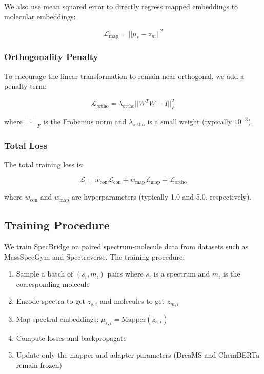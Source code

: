 \documentclass[11pt]{article}
\begin{document}
We also use mean squared error to directly regress mapped embeddings to molecular embeddings:

\begin{equation}
\mathcal{L}_{\text{map}} = ||\mu_s - z_m||^2
\end{equation}

\subsubsection{Orthogonality Penalty}

To encourage the linear transformation to remain near-orthogonal, we add a penalty term:

\begin{equation}
\mathcal{L}_{\text{ortho}} = \lambda_{\text{ortho}} ||W^T W - I||_F^2
\end{equation}

where $||\cdot||_F$ is the Frobenius norm and $\lambda_{\text{ortho}}$ is a small weight (typically $10^{-3}$).

\subsubsection{Total Loss}

The total training loss is:

\begin{equation}
\mathcal{L} = w_{\text{con}} \mathcal{L}_{\text{con}} + w_{\text{map}} \mathcal{L}_{\text{map}} + \mathcal{L}_{\text{ortho}}
\end{equation}

where $w_{\text{con}}$ and $w_{\text{map}}$ are hyperparameters (typically 1.0 and 5.0, respectively).

\subsection{Training Procedure}

We train SpecBridge on paired spectrum-molecule data from datasets such as MassSpecGym and Spectraverse. The training procedure:

\begin{enumerate}
    \item Sample a batch of $(s_i, m_i)$ pairs where $s_i$ is a spectrum and $m_i$ is the corresponding molecule
    \item Encode spectra to get $z_{s,i}$ and molecules to get $z_{m,i}$
    \item Map spectral embeddings: $\mu_{s,i} = \text{Mapper}(z_{s,i})$
    \item Compute losses and backpropagate
    \item Update only the mapper and adapter parameters (DreaMS and ChemBERTa remain frozen)
\end{enumerate}
\end{document}
